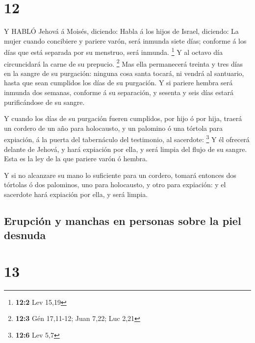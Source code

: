 \hypertarget{section-11}{%
\section{12}\label{section-11}}

 Y HABLÓ Jehová á Moisés, diciendo:  Habla á los
hijos de Israel, diciendo: La mujer cuando concibiere y pariere varón,
será inmunda siete días; conforme á los días que está separada por su
menstruo, será inmunda. \footnote{\textbf{12:2} Lev 15,19} 
Y al octavo día circuncidará la carne de su prepucio. \footnote{\textbf{12:3}
  Gén 17,11-12; Juan 7,22; Luc 2,21}  Mas ella permanecerá
treinta y tres días en la sangre de su purgación: ninguna cosa santa
tocará, ni vendrá al santuario, hasta que sean cumplidos los días de su
purgación.  Y si pariere hembra será inmunda dos semanas,
conforme á su separación, y sesenta y seis días estará purificándose de
su sangre.

 Y cuando los días de su purgación fueren cumplidos, por
hijo ó por hija, traerá un cordero de un año para holocausto, y un
palomino ó una tórtola para expiación, á la puerta del tabernáculo del
testimonio, al sacerdote: \footnote{\textbf{12:6} Lev 5,7} 
Y él ofrecerá delante de Jehová, y hará expiación por ella, y será
limpia del flujo de su sangre. Esta es la ley de la que pariere varón ó
hembra.

 Y si no alcanzare su mano lo suficiente para un cordero,
tomará entonces dos tórtolas ó dos palominos, uno para holocausto, y
otro para expiación: y el sacerdote hará expiación por ella, y será
limpia.

\hypertarget{erupciuxf3n-y-manchas-en-personas-sobre-la-piel-desnuda}{%
\subsection{Erupción y manchas en personas sobre la piel
desnuda}\label{erupciuxf3n-y-manchas-en-personas-sobre-la-piel-desnuda}}

\hypertarget{section-12}{%
\section{13}\label{section-12}}

